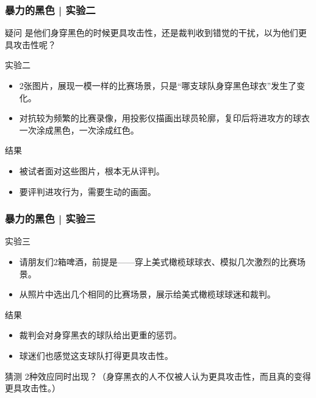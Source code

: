 \begin{frame}
  \frametitle{暴力的黑色 | 实验二}
  \begin{block}{疑问}
    是他们身穿黑色的时候更具攻击性，还是裁判收到错觉的干扰，以为他们更具攻击性呢？
  \end{block}
  \pause
  \begin{block}{实验二}
    \begin{itemize}
      \item 2张图片，展现一模一样的比赛场景，只是“哪支球队身穿黑色球衣”发生了变化。
      \item 对抗较为频繁的比赛录像，用投影仪描画出球员轮廓，复印后将进攻方的球衣一次涂成黑色，一次涂成红色。
    \end{itemize}
  \end{block}
  \pause
  \begin{block}{结果}
    \begin{itemize}
      \item 被试者面对这些图片，根本无从评判。
      \item 要评判进攻行为，需要生动的画面。
    \end{itemize}
  \end{block}
\end{frame}

\begin{frame}
  \frametitle{暴力的黑色 | 实验三}
  \begin{block}{实验三}
    \begin{itemize}
      \item 请朋友们2箱啤酒，前提是——穿上美式橄榄球球衣、模拟几次激烈的比赛场景。
      \item 从照片中选出几个相同的比赛场景，展示给美式橄榄球球迷和裁判。
    \end{itemize}
  \end{block}
  \pause
  \begin{block}{结果}
    \begin{itemize}
      \item 裁判会对身穿黑衣的球队给出更重的惩罚。
      \item 球迷们也感觉这支球队打得更具攻击性。
    \end{itemize}
  \end{block}
  \pause
  \begin{block}{猜测}
    2种效应同时出现？（身穿黑衣的人不仅被人认为更具攻击性，而且真的变得更具攻击性。）
  \end{block}
\end{frame}

